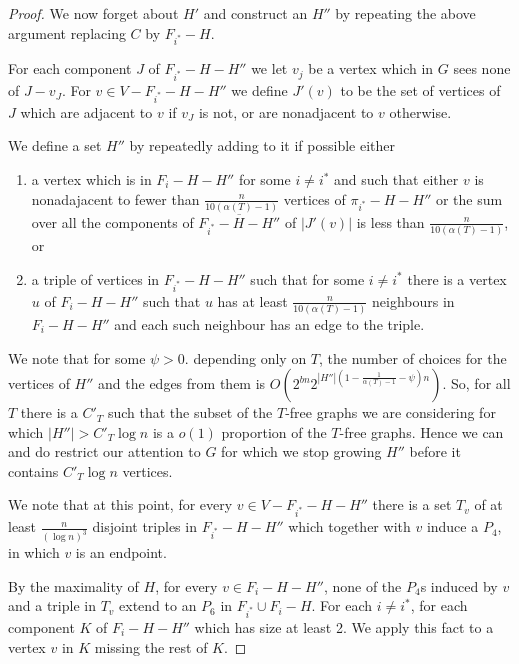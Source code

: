 \documentclass[10pt,a4paper]{amsart}
\begin{document}
\begin{proof}
We now forget about $H'$ and construct an $H''$ by  repeating the above argument replacing $C$ by $F_{i^*}-H$. 


For each component $J$ of $F_{i^*}-H-H''$ we let $v_j$ be a vertex which in $G$ sees none of $J-v_J$. 
For $v\in V-F_{i^*}-H-H''$ we define $J'(v)$ to be the set of vertices of $J$ which are adjacent to $v$ if $v_J$ is not, or are nonadjacent to $v$ otherwise. 

We define a set $H''$ by repeatedly adding to it  if possible either 
\begin{enumerate}
\item[(a)]  a vertex which  is  in $F_i-H-H''$ for some $i \neq {i^*}$  and such that either $v$ is nonadajacent to fewer than $\frac{n}{10(\alpha(T)-1)}$
vertices of $\pi_{i^*}-H-H''$ or the sum over all the components  of  $\overline{F_{i^*}-H-H''} $ of  $|J'(v)|$
is less than $\frac{n}{10(\alpha(T)-1)}$, or 
\item[(b)] a triple of vertices   in $F_{i^*}-H-H''$  such that  for some $i \neq {i^*}$  there is a vertex $u$ of $F_i-H-H''$ such that $u$  has at least
$\frac{n}{10(\alpha(T)-1)}$ neighbours in $F_i-H-H''$ and each such neighbour has an edge to the triple.  
\end{enumerate}

We note that for some $\psi>0$. depending only on $T$, the number of choices for the vertices of $H''$ and the edges from them is $O(2^{bn}2^{|H''|(1-\frac{1}{\alpha(T)-1}-\psi)n})$.
So, for all $T$ there is a $C'_T$ such that  the subset of the   $T$-free graphs  we are considering for which $|H''|>C'_T \log n$ is a $o(1)$ proportion of the $T$-free graphs. 
Hence we can  and do restrict our attention to $G$ for which we stop growing $H''$ before it contains $C'_T \log n$ vertices. 


We note that at this point, for every $v \in V-F_{i^*}-H-H''$  there  is a set $T_v$ of at least $\frac{n}{(\log n)^3}$ disjoint triples  in $F_{i^*}-H-H''$ which together with $v$ induce a $P_4$, in which $v$ is an endpoint. 

By the maximality of $H$,  for every $v \in F_i-H-H''$, none of the $P_4$s  induced by $v$ and a triple in $T_v$ extend to an  $P_6$ in $F_{i^*} \cup F_i-H$.
For each $i \neq i^*$,  for each component $K$ of $F_i-H-H''$ which has size at least 2. 
We apply  this fact to a vertex  $v$ in $K$ missing the rest of $K$. 



\end{proof}
\end{document}
